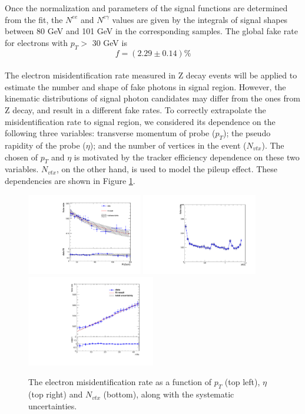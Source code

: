 \documentclass[thesis.tex]{subfiles}
\renewcommand\_{\textunderscore\allowbreak}
\begin{document}
Once the normalization and parameters of the signal functions are determined from the fit, the $N^{ee}$ and $N^{e\gamma}$ values are given by the integrals of signal shapes between 80 GeV and 101 GeV in the corresponding samples. The global fake rate for electrons with $p_T >$ 30 GeV is \\
\begin{equation}
        f = (2.29 \pm 0.14)\%
\end{equation}\\

The electron misidentification rate measured in Z decay events will be applied to estimate the number and shape of fake photons in signal region. However, the kinematic distributions of signal photon candidates may differ from the ones from Z decay, and result in a different fake rates. To correctly extrapolate the misidentification rate to signal region, we considered its dependence on the following three variables: transverse momentum of probe ($p_T$); the pseudo rapidity of the probe ($\eta$); and the number of vertices in the event ($N_{vtx}$). The chosen of $p_T$ and $\eta$ is motivated by the tracker efficiency dependence on these two variables. $N_{vtx}$, on the other hand, is used to model the pileup effect. These dependencies are shown in Figure \ref{fig:elefakepho_rate_pt}.


\begin{figure}
  \centering
    \includegraphics[width=0.45\textwidth]{Figures/elefake_pt_systematic_data.pdf}
    \includegraphics[width=0.45\textwidth]{Figures/elefake_eta_systematic_data.pdf}
     \includegraphics[width=0.5\textwidth]{Figures/elefake_vtx_systematic.pdf}
  \caption{The electron misidentification rate as a function of $p_T$ (top left), $\eta$ (top right) and $N_{vtx}$ (bottom), along with the systematic uncertainties.}
  \label{fig:elefakepho_rate_pt}
\end{figure}
\end{document}
